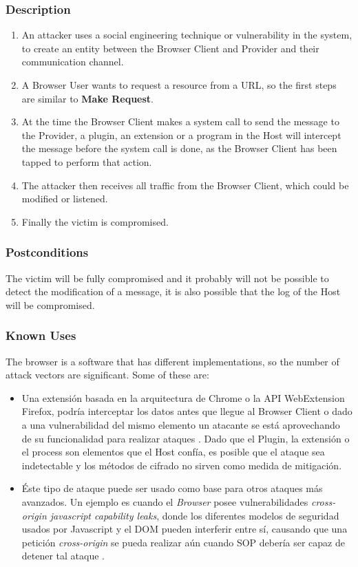 \documentclass{sig-alternate-05-2015}
\begin{document}
  \subsubsection{Description}
      \begin{enumerate}
        \item An attacker uses a social engineering technique or vulnerability in the system, to create an entity between the Browser Client and Provider and their communication channel.
        \item A Browser User wants to request a resource from a URL, so the first steps are similar to \textbf{Make Request}.
        \item At the time the Browser Client makes a system call to send the message to the Provider, a plugin, an extension or a program in the Host will intercept the message before the system call is done, as the Browser Client has been tapped to perform that action.
        \item The attacker then receives all traffic from the Browser Client, which could be modified or listened.
        \item Finally the victim is compromised.
      \end{enumerate}
  \subsubsection{Postconditions} The victim will be fully compromised and it probably will not be possible to detect the modification of a message, it is also possible that the log of the Host will be compromised.
  \subsubsection{Known Uses} The browser is a software that has different implementations, so the number of attack vectors are significant. Some of these are:
      \begin{itemize}
        \item  Una extensión basada en la arquitectura de Chrome o la API WebExtension Firefox, podría interceptar los datos antes que llegue al Browser Client \cite{Paola2006} o dado a una vulnerabilidad del mismo elemento un atacante se está aprovechando de su funcionalidad para realizar ataques \cite{Liu2012, Barth2010}. Dado que el Plugin, la extensión o el process son elementos que el Host confía, es posible que el ataque sea indetectable y los métodos de cifrado no sirven como medida de mitigación.
        \item Éste tipo de ataque puede ser usado como base para otros ataques más avanzados. Un ejemplo es cuando el \textit{Browser} posee vulnerabilidades \textit{cross-origin javascript capability leaks}, donde los diferentes modelos de seguridad usados por Javascript y el DOM pueden interferir entre sí, causando que una petición \textit{cross-origin} se pueda realizar aún cuando SOP debería ser capaz de detener tal ataque \cite{Barth2009}.
      \end{itemize}
\end{document}
